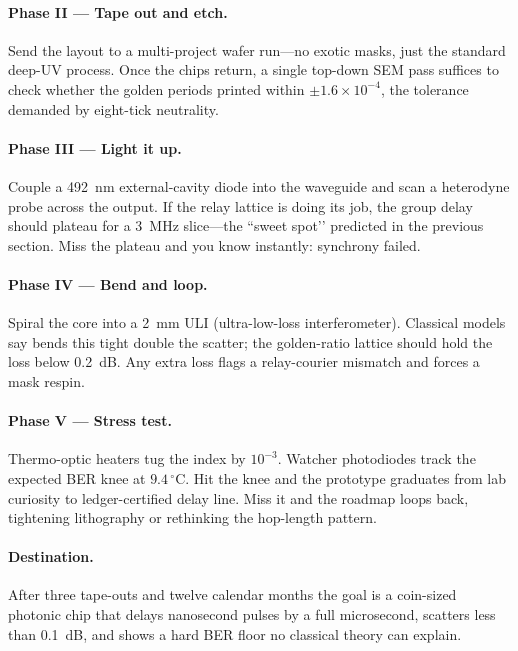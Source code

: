 \documentclass[11pt,oneside]{book}
\begin{document}
{\paragraph*{Phase II — Tape out and etch.}
Send the layout to a multi-project wafer run—no exotic masks, just the
standard deep-UV process.  
Once the chips return, a single top-down SEM pass suffices to check
whether the golden periods printed within \(\pm1.6\times10^{-4}\),
the tolerance demanded by eight-tick neutrality.

\paragraph*{Phase III — Light it up.}
Couple a \SI{492}{\nano\metre} external-cavity diode into the
wave­guide and scan a heterodyne probe across the output.  
If the relay lattice is doing its job, the group delay should plateau
for a \SI{3}{\mega\hertz} slice—the “sweet spot’’ predicted in the
previous section.  
Miss the plateau and you know instantly: synchrony failed.

\paragraph*{Phase IV — Bend and loop.}
Spiral the core into a \SI{2}{\milli\meter} ULI
(ultra-low-loss interferometer).  
Classical models say bends this tight double the scatter; the
golden-ratio lattice should hold the loss below \SI{0.2}{\dB}.  
Any extra loss flags a relay-courier mismatch and forces a mask
respin.

\paragraph*{Phase V — Stress test.}
Thermo-optic heaters tug the index by \(10^{-3}\).  
Watcher photodiodes track the expected BER knee at
\(9.4\,^{\circ}\text{C}\).  
Hit the knee and the prototype graduates from lab curiosity to
ledger-certified delay line.  
Miss it and the roadmap loops back, tightening lithography or
rethinking the hop-length pattern.

\paragraph*{Destination.}
After three tape-outs and twelve calendar months the goal is a
coin-sized photonic chip that delays nanosecond pulses by a full
microsecond, scatters less than \SI{0.1}{\dB}, and shows a hard BER
floor no classical theory can explain.

}
\end{document}
